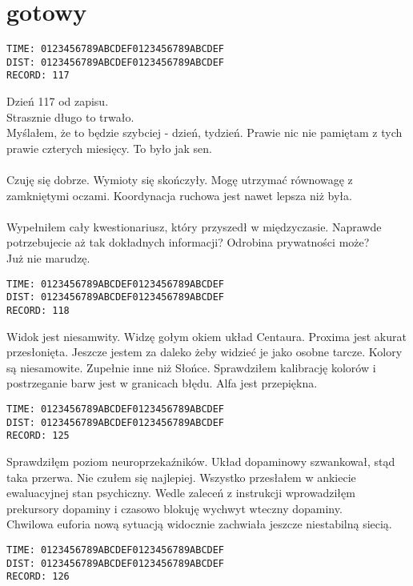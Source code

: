 \section{gotowy}
\label{sec:intro-ready}
\begin{verbatim}
TIME: 0123456789ABCDEF0123456789ABCDEF
DIST: 0123456789ABCDEF0123456789ABCDEF
RECORD: 117
\end{verbatim}
%
Dzień 117 od zapisu.\\
Strasznie długo to trwało.\\
Myślałem, że to będzie szybciej - dzień, tydzień. Prawie nic nie pamiętam z tych prawie czterych miesięcy. To było jak sen.\\
\\
Czuję się dobrze. Wymioty się skończyły. Mogę utrzymać równowagę z zamkniętymi oczami. Koordynacja ruchowa jest nawet lepsza niż była.\\
\\
Wypełniłem cały kwestionariusz, który przyszedł w międzyczasie. Naprawde potrzebujecie aż tak dokładnych informacji? Odrobina prywatności może?\\
Już nie marudzę.\\
%
\begin{verbatim}
TIME: 0123456789ABCDEF0123456789ABCDEF
DIST: 0123456789ABCDEF0123456789ABCDEF
RECORD: 118
\end{verbatim}
%
Widok jest niesamwity. Widzę gołym okiem układ Centaura. Proxima jest akurat przesłonięta. Jeszcze jestem za daleko żeby widzieć je jako osobne tarcze. Kolory są niesamowite. Zupełnie inne niż Słońce. Sprawdziłem kalibrację kolorów i postrzeganie barw jest w granicach błędu. Alfa jest przepiękna. 
%
\begin{verbatim}
TIME: 0123456789ABCDEF0123456789ABCDEF
DIST: 0123456789ABCDEF0123456789ABCDEF
RECORD: 125
\end{verbatim}
%
Sprawdziłęm poziom neuroprzekaźników. Układ dopaminowy szwankował, stąd taka przerwa. Nie czułem się najlepiej. Wszystko przesłałem w ankiecie ewaluacyjnej stan psychiczny. Wedle zaleceń z instrukcji wprowadziłęm prekursory dopaminy i czasowo blokuję wychwyt wteczny dopaminy.\\
Chwilowa euforia nową sytuacją widocznie zachwiała jeszcze niestabilną siecią.
%
\begin{verbatim}
TIME: 0123456789ABCDEF0123456789ABCDEF
DIST: 0123456789ABCDEF0123456789ABCDEF
RECORD: 126
\end{verbatim}

